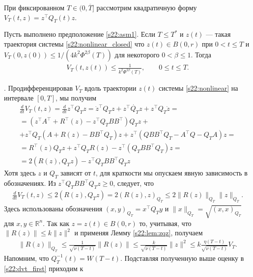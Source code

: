 \documentclass[../main.tex]{subfiles}
\begin{document}
При фиксированном $T\in (0, \overline{T}]$ рассмотрим квадратичную форму $V_T(t,z)=z^{\top}Q_T(t)z$.  
\begin{lemma}\label{s22:lem:vest}
 Пусть выполнено предположение \ref{s22:asm1}. 
Если $T\leqslant T^*$ и $z(t)$ --- такая траектория системы \eqref{s22:nonlinear_closed} что  $z(t)  \in B(0,r)$ при $0<t \leqslant T$ и $V_T(0,z(0))\leqslant 1/(4k^2\Phi^{2\beta}(T))$ для некоторого $0<\beta \leqslant 1$. 
 Тогда 
 \begin{gather*}
    V_T(t,z(t)) \leqslant \frac{1}{k^2\Phi^{2\beta}(T)}, \qquad 0 \leqslant t \leqslant T. 
 \end{gather*}
\end{lemma}
\doc. 
Продифференцировав $V_T$ вдоль траектории $z(t)$ системы \eqref{s22:nonlinear}  на интервале $[0, T]$, мы получим
\begin{gather*}
    \frac{d}{dt}V_T(t,z) = \frac{d}{dt}z^{\top}Q_Tz = \dot{z}^{\top} Q_T z + z^{\top} \dot{Q_T} z + z^{\top} Q_T \dot{z} = \\
    =\left(z^{\top} A^{\top} + R^{\top}(z)- z^{\top} Q_T B B^{\top}\right) Q_T z + \\ +
        z^{\top} Q_T \left(A +R(z) - B B^{\top} Q_T\right)z + z^{\top} \left(Q B B^{\top} Q_T - A^{\top}Q - Q_T A \right) z = \\
    = R^{\top}(z)Q_T z + z^{\top} Q_T R(z) - z^{\top} (Q_T B B^{\top} Q_T) z = \\
    = 2 \left( R(z), Q_Tz \right) - z^{\top} Q_T B B^{\top} Q_T z 
\end{gather*}
Хотя здесь $z$ и $Q_T$ зависят от $t$, для краткости мы опускаем явную зависимость в обозначениях.  
Из $z^{\top} Q_T B B^{\top} Q_T z\geqslant 0$, следует, что
\begin{gather}\label{s22:dvt_first}
    \frac{d}{dt}V_T(t,z) \leqslant 2 \left( R(z), Q_T z\right)=2(R(z),z)_{Q_T} \leqslant 2 \| R(z) \|_{Q_T} \| z \|_{Q_T}.
\end{gather}
Здесь использованы обозначения $(x,y)_{Q_T}=x^\top Q_Ty$ и  $\| x \|_{Q_T} =\sqrt{(x,x)_{Q_T}}$ для $x,y\in \mathbb R^n$. 
Так как $z = z(t) \in B(0,r)$ то, учитывая, что $\|R(z)\| \leqslant k\|z\|^2$  и применяя Лемму \ref{s22:lem:zqz}, получаем 
\begin{gather}\label{s22:rqr_est}
     \| R(z) \|_{Q_T} \leqslant \frac{1}{\sqrt{\nu(T - t)}} \|R(z)\| \leqslant \frac{k}{\sqrt{\nu(T - t)}}\|z\|^2 \leqslant k \frac{\eta(T-t)}{\sqrt{\nu(T-t)}}V_T.
\end{gather}
Напомним, что  $ Q_T^{-1}(t) = W(T-t) $.
Подставляя полученную выше оценку в \eqref{s22:dvt_first} приходим к
\end{document}
